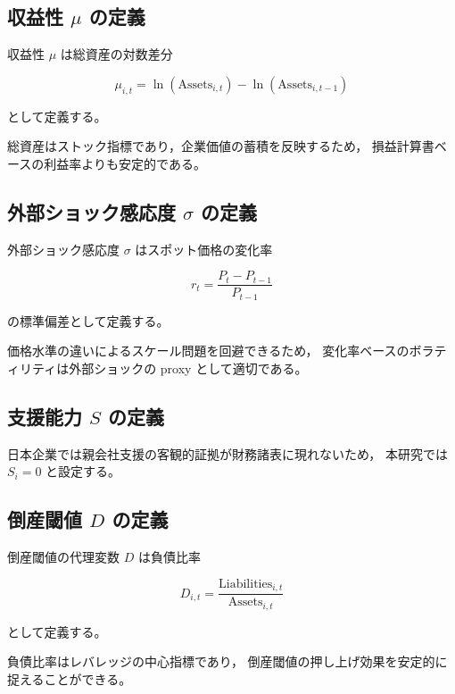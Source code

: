 \subsection{収益性 $\mu$ の定義}

収益性 $\mu$ は総資産の対数差分



\[
\mu_{i,t} = \ln(\text{Assets}_{i,t}) - \ln(\text{Assets}_{i,t-1})
\]



として定義する。

総資産はストック指標であり，企業価値の蓄積を反映するため，
損益計算書ベースの利益率よりも安定的である。

\subsection{外部ショック感応度 $\sigma$ の定義}

外部ショック感応度 $\sigma$ はスポット価格の変化率



\[
r_t = \frac{P_t - P_{t-1}}{P_{t-1}}
\]



の標準偏差として定義する。

価格水準の違いによるスケール問題を回避できるため，
変化率ベースのボラティリティは外部ショックの proxy として適切である。

\subsection{支援能力 $S$ の定義}

日本企業では親会社支援の客観的証拠が財務諸表に現れないため，
本研究では $S_i = 0$ と設定する。

\subsection{倒産閾値 $D$ の定義}

倒産閾値の代理変数 $D$ は負債比率



\[
D_{i,t}=\frac{\text{Liabilities}_{i,t}}{\text{Assets}_{i,t}}
\]



として定義する。

負債比率はレバレッジの中心指標であり，
倒産閾値の押し上げ効果を安定的に捉えることができる。

